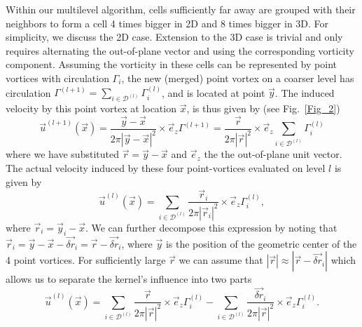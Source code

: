 \documentclass[preprint,12pt]{elsarticle}
\begin{document}
Within our multilevel algorithm, cells sufficiently far away are grouped with their neighbors to form a cell 4 times bigger in 2D and 8 times bigger in 3D. For simplicity, we discuss the 2D case. Extension to the 3D case is trivial and only requires alternating the out-of-plane vector and using the corresponding vorticity component. Assuming the vorticity in these cells can be represented by point vortices with circulation $\Gamma_i$, the new (merged) point vortex on a coarser level has circulation $\Gamma^{(l+1)} =\sum_{i\in\mathcal{D}^{(l)}}\Gamma^{(l)}_i$, and is located at point $\vec{y}$. The induced velocity by this point vortex at location $\vec x$, is thus given by (see Fig.~\ref{Fig_2})
\begin{equation}\label{eq:induced_1}
    \vec{u}^{(l+1)}(\vec{x}) = \frac{\vec{y}-\vec{x}}{2\pi|\vec{y}-\vec{x}|^2}\times\vec{e}_z\Gamma^{(l+1)} = \frac{\vec{r}}{2\pi|\vec{r}|^2}\times\vec{e}_z\sum_{i\in\mathcal{D}^{(l)}}\Gamma^{(l)}_i
\end{equation}
where we have substituted $\vec{r}=\vec{y}-\vec{x}$ and $\vec{e}_z$ the the out-of-plane unit vector. The actual velocity induced by these four point-vortices evaluated on level $l$ is given by
\begin{equation}
    \vec{u}^{(l)}(\vec{x}) = \sum_{i\in\mathcal{D}^{(l)}}\frac{\vec{r}_i}{2\pi|\vec{r}_i|^2}\times\vec{e}_z\Gamma^{(l)}_i,
\end{equation}
where $\vec{r}_i=\vec{y}_i-\vec{x}$. We can further decompose this expression by noting that $\vec{r}_i=\vec{y}-\vec{x}-\vec{\delta r}_i=\vec{r}-\vec{\delta r}_i$, where $\vec{y}$ is the position of the geometric center of the 4 point vortices. 
For sufficiently large $\vec{r}$ we can assume that $|\vec{r}|\approx|\vec{r}-\vec{\delta r}_i|$ %
which allows us to separate the kernel's influence into two parts
\begin{equation}
    \vec{u}^{(l)}(\vec{x}) = \sum_{i\in\mathcal{D}^{(l)}}\frac{\vec{r}}{2\pi|\vec{r}|^2}\times\vec{e}_z\Gamma^{(l)}_i-\sum_{i\in\mathcal{D}^{(l)}}\frac{\vec{\delta r}_i}{2\pi|\vec{r}|^2}\times\vec{e}_z\Gamma^{(l)}_i.
\end{equation}
\end{document}
